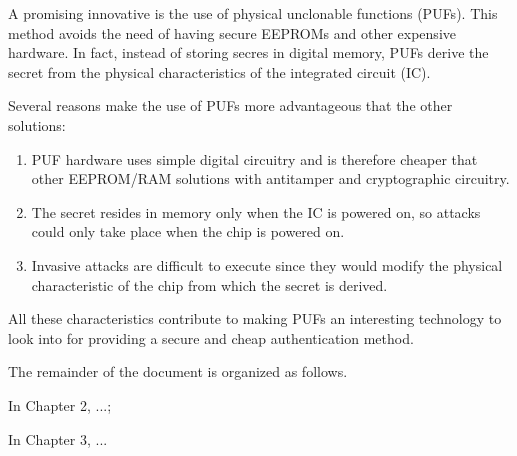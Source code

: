 A promising innovative is the use of physical unclonable functions (PUFs). This method avoids the need of having secure EEPROMs and other expensive hardware. In fact, instead of storing secres in digital memory, PUFs derive the secret from the physical characteristics of the integrated circuit (IC).

Several reasons make the use of PUFs more advantageous that the other solutions:
\begin{enumerate}
\item PUF hardware uses simple digital circuitry and is therefore cheaper that other EEPROM/RAM solutions with antitamper and cryptographic circuitry.
\item The secret resides in memory only when the IC is powered on, so attacks could only take place when the chip is powered on.
\item Invasive attacks are difficult to execute since they would modify the physical characteristic of the chip from which the secret is derived.
\end{enumerate} 

All these characteristics contribute to making PUFs an interesting technology to look into for providing a secure and cheap authentication method.

\vspace{1.5em}
The remainder of the document is organized as follows. 


In Chapter 2, ...; 

In Chapter 3, ... 




